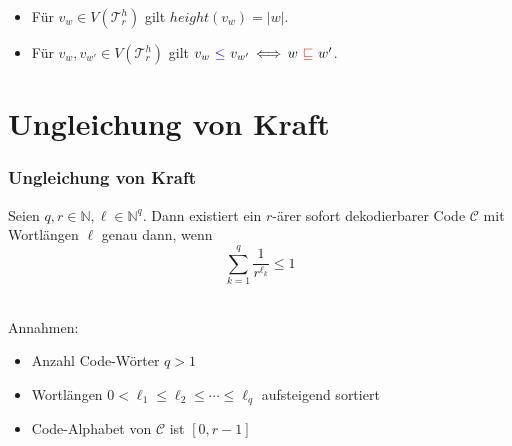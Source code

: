 \documentclass{beamer}
\begin{document}
\begin{frame}[t]
\begin{center}
    \end{center}
    \pause
    \begin{itemize}
        \setlength\itemsep{2em}
        \item Für $v_w \in V(\mathcal{T}_r^h)$ gilt $height(v_w) = |w|$.
        \pause
        \item Für $v_w, v_{w'} \in V(\mathcal{T}_r^h)$ gilt
            $v_w\ {\color{blue}\leq}\ v_{w'} \,\Longleftrightarrow\, w\ {\color{red}\sqsubseteq}\ w'$.
    \end{itemize}
\end{frame}

\section{Ungleichung von Kraft}
\begin{frame}
    \frametitle{Ungleichung von Kraft}
    Seien $q,r \in \mathbb{N}, \ell \in \mathbb{N}^q$. Dann existiert ein $r$-ärer sofort dekodierbarer Code $\mathcal{C}$
    mit Wortlängen $\ell$ genau dann, wenn
    $$
        \sum_{k=1}^{q} \frac{1}{r^{\ell_k}} \leq 1
    $$\\[20pt]
    \pause

    Annahmen:

    \begin{itemize}
        \setlength\itemsep{1em}
        \item Anzahl Code-Wörter $q > 1$
        \pause
        \item Wortlängen $0 < \ell_1 \leq \ell_2 \leq \cdots \leq \ell_q$
            aufsteigend sortiert
        \pause
        \item Code-Alphabet von $\mathcal{C}$ ist $[0,r-1]$
    \end{itemize}
\end{frame}
\end{document}
